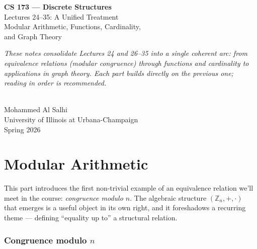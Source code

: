 \documentclass[11pt]{article}
\theoremstyle{defstyle}
\theoremstyle{thmstyle}
\theoremstyle{notstyle}
\theoremstyle{cautionstyle}
\newcommand{\Zn}{\mathbb{Z}_n}
\begin{document}
\thispagestyle{empty}
\begin{center}
  \vspace*{2cm}
  {\Huge\bfseries CS 173 --- Discrete Structures}\\[10pt]
  {\Large Lectures 24--35: A Unified Treatment}\\[6pt]
  {\large Modular Arithmetic, Functions, Cardinality,\\and Graph Theory}\\[2cm]

  \begin{minipage}{0.8\textwidth}
  \centering\itshape\small\color{gray}
  These notes consolidate Lectures 24 and 26--35 into a single coherent
  arc: from equivalence relations (modular congruence) through functions
  and cardinality to applications in graph theory.  Each part builds
  directly on the previous one; reading in order is recommended.
  \end{minipage}\\[2cm]

  Mohammed Al Salhi\\[2pt]
  {\small\color{gray} University of Illinois at Urbana-Champaign}\\[2pt]
  {\small\color{gray} Spring 2026}
\end{center}
\vfill

\newpage
\tableofcontents
\newpage

\part{Modular Arithmetic}

This part introduces the first non-trivial example of an equivalence
relation we'll meet in the course: \emph{congruence modulo $n$}.  The
algebraic structure $(\Zn, +, \cdot)$ that emerges is a useful object
in its own right, and it foreshadows a recurring theme --- defining
``equality up to'' a structural relation.

\section{Congruence modulo \texorpdfstring{$n$}{n}}
\end{document}

